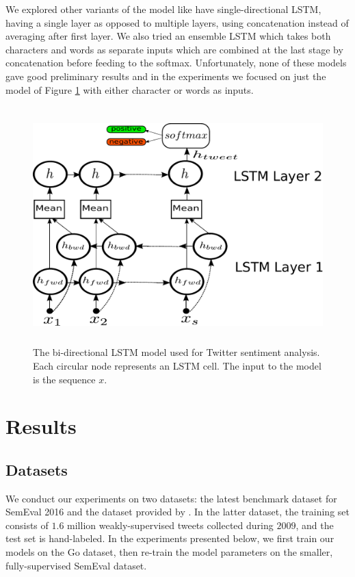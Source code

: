 \documentclass{article} %
\begin{document}
We explored other variants of the model like have single-directional LSTM, having a single layer as opposed to multiple layers, using concatenation instead of averaging after first layer. We also tried an ensemble LSTM which takes both characters and words as separate inputs which are combined at the last stage by concatenation before feeding to the softmax. Unfortunately, none of these models gave good preliminary results and in the experiments we focused on just the model of Figure \ref{fig:mylstm} with either character or words as inputs.

\begin{figure}[t]
	\centering
	\includegraphics[width=\textwidth, height=3.6in]{figs/mylstm.pdf}
	\caption{The bi-directional LSTM model used for Twitter sentiment analysis. Each circular node represents an LSTM cell. The input to the model is the sequence $x$. }
	\label{fig:mylstm}
\end{figure}


\section{Results}

\subsection{Datasets}
We conduct our experiments on two datasets: the latest benchmark dataset for SemEval 2016 and the dataset provided by \cite{go2009twitter}. In the latter dataset, the training set consists of $1.6$ million weakly-supervised tweets collected during $2009$, and the test set is hand-labeled. In the experiments presented below, we first train our models on the Go dataset, then re-train the model parameters on the smaller, fully-supervised SemEval dataset.
\end{document}
